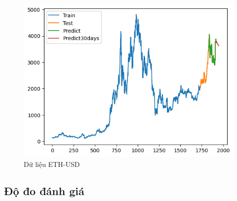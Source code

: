 \documentclass[conference]{IEEEtran}
\begin{document}
\begin{figure}[H]
\begin{minipage}{0.15\textwidth}
			\includegraphics[width=1\textwidth]{Figure/GRU_ETH_91.png}
		\end{minipage}
		\caption{Dữ liệu ETH-USD}
		\label{fig:1}
	\end{figure}
	
	\subsection{Độ đo đánh giá}
	
\end{document}
